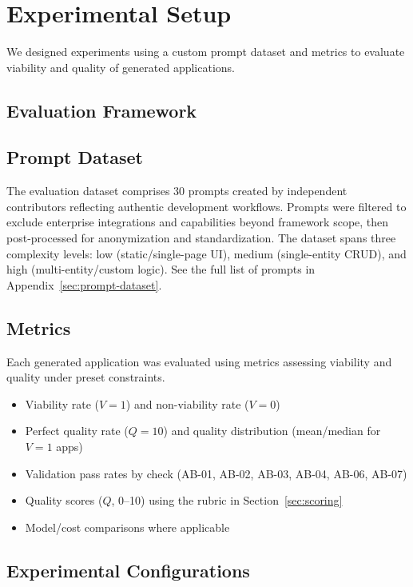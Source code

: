 \documentclass{article}
\begin{document}
\section{Experimental Setup}
\label{sec:experimental-setup}

We designed experiments using a custom prompt dataset and metrics to evaluate viability and quality of generated applications.

\subsection{Evaluation Framework}

\subsection{Prompt Dataset}
\label{sec:prompt-dataset-desc}

The evaluation dataset comprises 30 prompts created by independent contributors reflecting authentic development workflows. Prompts were filtered to exclude enterprise integrations and capabilities beyond framework scope, then post-processed for anonymization and standardization. The dataset spans three complexity levels: low (static/single-page UI), medium (single-entity CRUD), and high (multi-entity/custom logic).
See the full list of prompts in Appendix~\ref{sec:prompt-dataset}.

\subsection{Metrics}

Each generated application was evaluated using metrics assessing viability and quality under preset constraints.

\begin{itemize}
\item Viability rate ($V=1$) and non-viability rate ($V=0$)
\item Perfect quality rate ($Q=10$) and quality distribution (mean/median for $V=1$ apps)
\item Validation pass rates by check (AB-01, AB-02, AB-03, AB-04, AB-06, AB-07)
\item Quality scores ($Q$, 0--10) using the rubric in Section~\ref{sec:scoring}
\item Model/cost comparisons where applicable
\end{itemize}

\subsection{Experimental Configurations}
\end{document}

